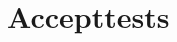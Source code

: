 \documentclass[Rapport/Rapport_main.tex]{subfiles}
\begin{document}
\section{Accepttests}
\end{document}
